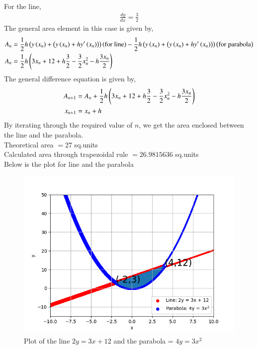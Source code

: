 \documentclass[journal]{IEEEtran}
\begin{document}
For the line,
\begin{align}
	\frac{dy}{dx} = \frac{3}{2}
\end{align}
The general area element in this case is given by,
\begin{align}
	A_n &= \frac{1}{2} h \left(y\left(x_n\right) + \left(y\left(x_n\right) + hy^\prime\left(x_n\right)\right)\right)\left(\text{for line}\right) - \frac{1}{2} h \left(y\left(x_n\right) + \left(y\left(x_n\right) + hy^\prime\left(x_n\right)\right)\right)\left(\text{for parabola}\right)\\
	A_n &= \frac{1}{2} h \left(3x_n + 12 + h\frac{3}{2} - \frac{3}{2}x_n^2 - h\frac{3x_n}{2}\right)\\
\end{align}
The general difference equation is given by,
\begin{align}
	A_{n+1} &= A_n + \frac{1}{2}h\left(3x_n + 12 + h\frac{3}{2} - \frac{3}{2}x_n^2 - h\frac{3x_n}{2}\right)\\
	x_{n+1} &= x_n + h
\end{align}
By iterating through the required value of $n$, we get the area enclosed between the line and the parabola.\\
Theoretical area $= 27$ sq.units\\
Calculated area through trapezoidal rule $= 26.9815636$ sq.units\\

Below is the plot for line and the parabola
\begin{figure}[h!]
	\centering
	\includegraphics[width=1\columnwidth]{figs/simulated.png}
	\caption{Plot of the line $2y = 3x + 12$ and the parabola = $4y = 3x^2$}
	\label{stemplot}
\end{figure}
\end{document}
